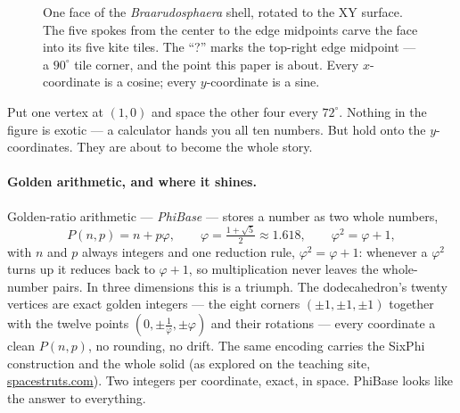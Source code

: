\documentclass[11pt]{article}
\newcommand{\phigr}{\varphi}
\begin{document}
\begin{figure}[h]
\centering
{}
\caption{One face of the \emph{Braarudosphaera} shell, rotated to the XY surface. The five spokes from
the center to the edge midpoints carve the face into its five kite tiles. The ``?'' marks the top-right
edge midpoint --- a $90^\circ$ tile corner, and the point this paper is about. Every $x$-coordinate is a
cosine; every $y$-coordinate is a sine.}
\label{fig:trig}
\end{figure}

Put one vertex at $(1,0)$ and space the other four every $72^\circ$. Nothing in the figure is exotic ---
a calculator hands you all ten numbers. But hold onto the $y$-coordinates. They are about to become the
whole story.

\paragraph{Golden arithmetic, and where it shines.} Golden-ratio arithmetic --- \emph{PhiBase} --- stores
a number as two whole numbers,
\[
P(n,p) = n + p\phigr, \qquad \phigr = \tfrac{1+\sqrt5}{2} \approx 1.618, \qquad \phigr^2 = \phigr + 1,
\]
with $n$ and $p$ always integers and one reduction rule, $\phigr^2 = \phigr + 1$: whenever a $\phigr^2$ turns
up it reduces back to $\phigr + 1$, so multiplication never leaves the whole-number pairs. In three
dimensions this is a triumph. The dodecahedron's twenty vertices are exact golden integers --- the eight
corners $(\pm1,\pm1,\pm1)$ together with the twelve points $(0,\pm\tfrac{1}{\phigr},\pm\phigr)$ and their
rotations --- every coordinate a clean $P(n,p)$, no rounding, no drift. The same encoding carries the
SixPhi construction and the whole solid (as explored on the teaching site,
\href{https://spacestruts.com}{spacestruts.com}). Two integers per coordinate, exact, in space. PhiBase
looks like the answer to everything.
\end{document}
